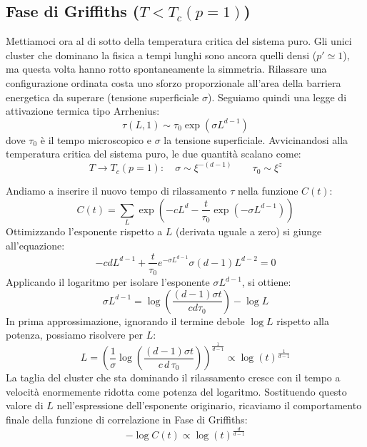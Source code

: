 \subsection{Fase di Griffiths ($T < T_c(p=1)$)}
Mettiamoci ora al di sotto della temperatura critica del sistema puro. Gli unici cluster che dominano la fisica a tempi lunghi sono ancora quelli densi ($p' \simeq 1$), ma questa volta hanno rotto spontaneamente la simmetria. 
Rilassare una configurazione ordinata costa uno sforzo proporzionale all'area della barriera energetica da superare (tensione superficiale $\sigma$). Seguiamo quindi una legge di attivazione termica tipo Arrhenius:
\begin{equation}
    \tau(L, 1) \sim \tau_0 \exp\left( \sigma L^{d-1} \right)
\end{equation}
dove $\tau_0$ è il tempo microscopico e $\sigma$ la tensione superficiale. Avvicinandosi alla temperatura critica del sistema puro, le due quantità scalano come:
\begin{equation}
    T \to T_c(p=1) : \quad \sigma \sim \xi^{-(d-1)} \qquad \tau_0 \sim \xi^z
\end{equation}

Andiamo a inserire il nuovo tempo di rilassamento $\tau$ nella funzione $C(t)$:
\begin{equation}
    C(t) = \sum_L \exp\left( - c L^d - \frac{t}{\tau_0} \exp\left( - \sigma L^{d-1} \right) \right)
\end{equation}
Ottimizzando l'esponente rispetto a $L$ (derivata uguale a zero) si giunge all'equazione:
\begin{equation}
    - c d L^{d-1} + \frac{t}{\tau_0} e^{-\sigma L^{d-1}} \sigma (d-1) L^{d-2} = 0
\end{equation}
Applicando il logaritmo per isolare l'esponente $\sigma L^{d-1}$, si ottiene:
\begin{equation}
    \sigma L^{d-1} = \log\left( \frac{(d-1)\sigma t}{c d \tau_0} \right) - \log L
\end{equation}
In prima approssimazione, ignorando il termine debole $\log L$ rispetto alla potenza, possiamo risolvere per $L$:
\begin{equation}
    L = \left( \frac{1}{\sigma} \log\left( \frac{(d-1)\sigma t}{c\, d\, \tau_0} \right) \right)^{\frac{1}{d-1}} \propto \log(t)^{\frac{1}{d-1}}
\end{equation}
La taglia del cluster che sta dominando il rilassamento cresce con il tempo a velocità enormemente ridotta come potenza del logaritmo. Sostituendo questo valore di $L$ nell'espressione dell'esponente originario, ricaviamo il comportamento finale della funzione di correlazione in Fase di Griffiths:
\begin{equation}
    - \log C(t) \propto \log(t)^{\frac{d}{d-1}}
\end{equation}

